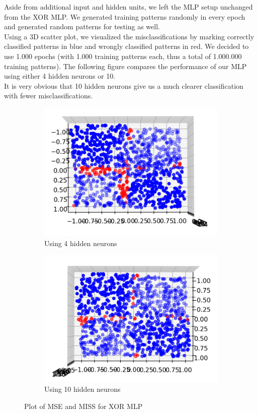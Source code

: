\documentclass[12pt]{article}
\begin{document}
\noindent
Aside from additional input and hidden units, we left the MLP setup unchanged from the XOR MLP. We generated training patterns randomly in every epoch and generated random patterns for testing as well. \\
Using a 3D scatter plot, we visualized the misclassifications by marking correctly classified patterns in blue and wrongly classified patterns in red. We decided to use 1.000 epochs (with 1.000 training patterns each, thus a total of 1.000.000 training patterns). The following figure compares the performance of our MLP using either 4 hidden neurons or 10. \\
It is very obvious that 10 hidden neurons give us a much clearer classification with fewer misclassifications. 

\begin{figure}[h!]
	\centering
	\begin{subfigure}{.49\linewidth}
	  \centering
	  \includegraphics[width=\linewidth]{img/sign1M4.png}
	  \caption{Using 4 hidden neurons}
	  \label{fig:sign4}
	\end{subfigure}
	\begin{subfigure}{.49\linewidth}
	  \centering
	  \includegraphics[width=\linewidth]{img/sign1M10.png}
	  \caption{Using 10 hidden neurons}
	  \label{fig:sign10}
	\end{subfigure}
	\caption{Plot of MSE and MISS for XOR MLP}
	\label{fig:test}
\end{figure}
\end{document}
